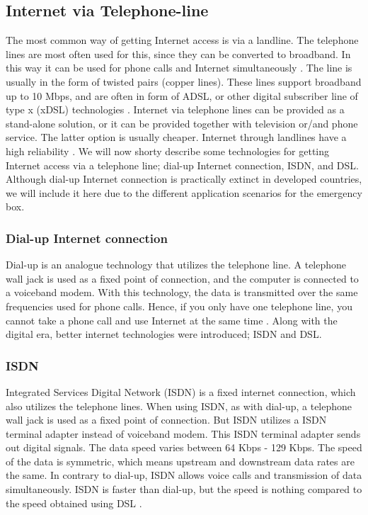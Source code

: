 \subsection{Internet via Telephone-line}
The most common way of getting Internet access is via a landline. The telephone lines are most often used for this, since they can be converted to broadband. In this way it can be used for phone calls and Internet simultaneously \cite{internet}. The line is usually in the form of twisted pairs (copper lines). These lines support broadband up to 10 Mbps, and are often in form of ADSL, or other digital subscriber line of type x (xDSL) technologies \citep{audestad}. Internet via telephone lines can be provided as a stand-alone solution, or it can be provided together with television or/and phone service. The latter option is usually cheaper. Internet through landlines have a high reliability \cite{cablevssatellite}. We will now shorty describe some technologies for getting Internet access via a telephone line; dial-up Internet connection, ISDN, and DSL. Although dial-up Internet connection is practically extinct in developed countries, we will include it here due to the different application scenarios for the emergency box. 

\subsubsection{Dial-up Internet connection}
Dial-up is an analogue technology that utilizes the telephone line. A telephone wall jack is used as a fixed point of connection, and the computer is connected to a voiceband modem. With this technology, the data is transmitted over the same frequencies used for phone calls. Hence, if you only have one telephone line, you cannot take a phone call and use Internet at the same time \cite{differentuplinks}. Along with the digital era, better internet technologies were introduced; ISDN and DSL. 

\subsubsection{ISDN}
Integrated Services Digital Network (ISDN) is a fixed internet connection, which also utilizes the telephone lines. When using ISDN, as with dial-up, a telephone wall jack is used as a fixed point of connection. But ISDN utilizes a ISDN terminal adapter instead of voiceband modem. This ISDN terminal adapter sends out digital signals. The data speed varies between 64 Kbps - 129 Kbps. The speed of the data is symmetric, which means upstream and downstream data rates are the same. In contrary to dial-up, ISDN allows voice calls and transmission of data simultaneously. ISDN is faster than dial-up, but the speed is nothing compared to the speed obtained using DSL \cite{differentuplinks}. 

